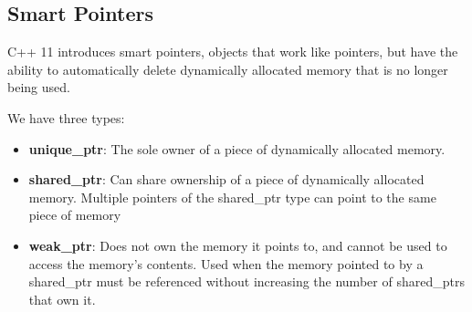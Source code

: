 \documentclass{report}
\begin{document}
    \bigbreak \noindent 
    \subsection{Smart Pointers}
    \bigbreak \noindent 
    \begin{concept}
 C++ 11 introduces smart pointers, objects that work like pointers, but have the ability to automatically delete dynamically allocated memory that is no longer being used.
	\end{concept}
    \bigbreak \noindent 
    We have three types:
    \begin{itemize}
        \item \textbf{unique\_ptr}: The sole owner of a piece of dynamically allocated memory. 
        \item \textbf{shared\_ptr}: Can share ownership of a piece of dynamically allocated memory. Multiple pointers of the shared\_ptr type can point to the same piece of memory
        \item \textbf{weak\_ptr}: Does not own the memory it points to, and cannot be used to access the memory's contents. Used when the memory pointed to by a shared\_ptr must be referenced without increasing the number of shared\_ptrs that own it.
    \end{itemize}
    \bigbreak \noindent 
\end{document}
